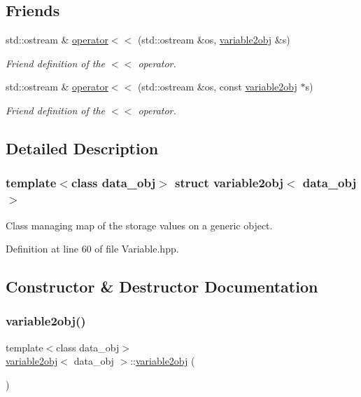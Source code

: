 \subsection*{Friends}
\begin{DoxyCompactItemize}
\item 
std\+::ostream \& \hyperlink{structvariable2obj_a616565ebb782b844f30ef1e77bab6293}{operator$<$$<$} (std\+::ostream \&os, \hyperlink{structvariable2obj}{variable2obj} \&s)
\begin{DoxyCompactList}\small\item\em Friend definition of the $<$$<$ operator. \end{DoxyCompactList}\item 
std\+::ostream \& \hyperlink{structvariable2obj_ac8f9096ea38db98770e9e523552233fb}{operator$<$$<$} (std\+::ostream \&os, const \hyperlink{structvariable2obj}{variable2obj} $\ast$s)
\begin{DoxyCompactList}\small\item\em Friend definition of the $<$$<$ operator. \end{DoxyCompactList}\end{DoxyCompactItemize}


\subsection{Detailed Description}
\subsubsection*{template$<$class data\+\_\+obj$>$\newline
struct variable2obj$<$ data\+\_\+obj $>$}

Class managing map of the storage values on a generic object. 

Definition at line 60 of file Variable.\+hpp.



\subsection{Constructor \& Destructor Documentation}
\mbox{\label{structvariable2obj_afc52982e1eea6ceca5d6e41c8f2162c7}} 
\subsubsection{\texorpdfstring{variable2obj()}{variable2obj()}}
{\footnotesize\ttfamily template$<$class data\+\_\+obj$>$ \\
\hyperlink{structvariable2obj}{variable2obj}$<$ data\+\_\+obj $>$\+::\hyperlink{structvariable2obj}{variable2obj} (\begin{DoxyParamCaption}{ }\end{DoxyParamCaption})\hspace{0.3cm}{\ttfamily [default]}}



